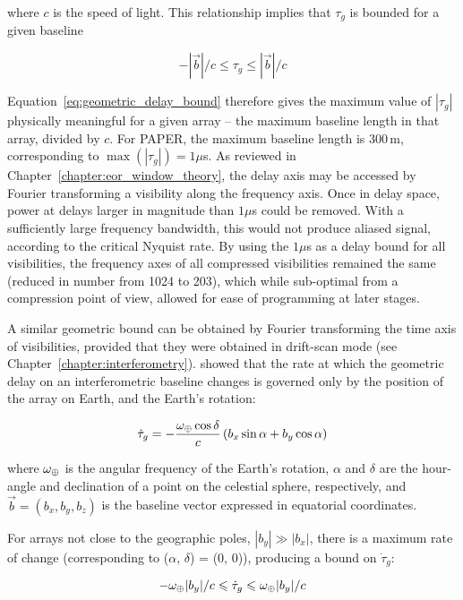 where $c$ is the speed of light. This relationship implies that $\tau_g$ is bounded for a given baseline

\begin{equation}
- |\vec{b}|/c \leqslant \tau_g \leqslant |\vec{b}|/c
\label{eq:geometric_delay_bound}
\end{equation}

Equation~\ref{eq:geometric_delay_bound} therefore gives the maximum value of $|\tau_g|$ physically meaningful for a given array -- the maximum baseline length in that array, divided by $c$. For PAPER, the maximum baseline length is 300\,m, corresponding to $\max(|\tau_g|) = 1\mu$s. 
As reviewed in Chapter~\ref{chapter:eor_window_theory}, the delay axis may be accessed by Fourier transforming a visibility along the frequency axis. Once in delay space, power at delays larger in magnitude than $1 \mu$s could be removed. With a sufficiently large frequency bandwidth, this would not produce aliased signal, according to the critical Nyquist rate. By using the $1 \mu$s as a delay bound for all visibilities, the frequency axes of all compressed visibilities remained the same (reduced in number from 1024 to 203), which while sub-optimal from a compression point of view, allowed for ease of programming at later stages.

A similar geometric bound can be obtained by Fourier transforming the time axis of visibilities, provided that they were obtained in drift-scan mode (see Chapter~\ref{chapter:interferometry}). \cite{ParsonsBacker.09} showed that the rate at which the geometric delay on an interferometric baseline changes is governed only by the position of the array on Earth, and the Earth's rotation:

\begin{equation}
\dot{\tau}_g = -\frac{\omega_{\oplus} \cos\delta}{c} \left( b_x\sin\alpha + b_y\cos\alpha\right)
\end{equation}

where $\omega_{\oplus}$ is the angular frequency of the Earth's rotation, $\alpha$ and $\delta$ are the hour-angle and declination of a point on the celestial sphere, respectively, and $\vec{b}=(b_x,b_y,b_z)$ is the baseline vector expressed in equatorial coordinates.

For arrays not close to the geographic poles, $|b_y| \gg |b_x|$, there is a maximum rate of change (corresponding to ($\alpha$, $\delta$) = (0, 0)), producing a bound on $\dot{\tau}_g$:

\begin{equation}
- \omega_{\oplus}|b_y|/c \leqslant \dot{\tau}_g\leqslant \omega_{\oplus} |b_y|/c
\label{eq:geometric_delay_rate_bound}
\end{equation}

